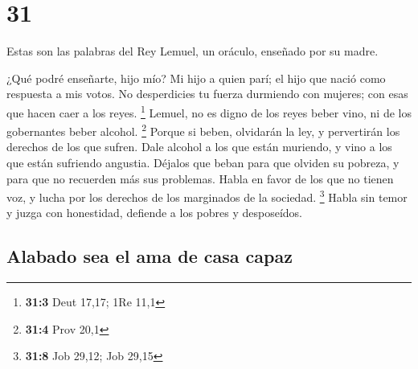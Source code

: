 \hypertarget{section-30}{%
\section{31}\label{section-30}}

 Estas son las palabras del Rey Lemuel, un oráculo, enseñado
por su madre.

 ¿Qué podré enseñarte, hijo mío? Mi hijo a quien parí; el
hijo que nació como respuesta a mis votos.  No desperdicies
tu fuerza durmiendo con mujeres; con esas que hacen caer a los reyes.
\footnote{\textbf{31:3} Deut 17,17; 1Re 11,1}  Lemuel, no es
digno de los reyes beber vino, ni de los gobernantes beber alcohol.
\footnote{\textbf{31:4} Prov 20,1}  Porque si beben,
olvidarán la ley, y pervertirán los derechos de los que sufren.
 Dale alcohol a los que están muriendo, y vino a los que
están sufriendo angustia.  Déjalos que beban para que
olviden su pobreza, y para que no recuerden más sus problemas.
 Habla en favor de los que no tienen voz, y lucha por los
derechos de los marginados de la sociedad. \footnote{\textbf{31:8} Job
  29,12; Job 29,15}  Habla sin temor y juzga con honestidad,
defiende a los pobres y desposeídos.

\hypertarget{alabado-sea-el-ama-de-casa-capaz}{%
\subsection{Alabado sea el ama de casa
capaz}\label{alabado-sea-el-ama-de-casa-capaz}}

